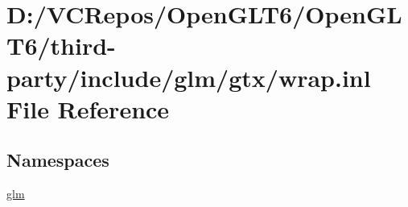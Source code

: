 \hypertarget{wrap_8inl}{}\section{D\+:/\+V\+C\+Repos/\+Open\+G\+L\+T6/\+Open\+G\+L\+T6/third-\/party/include/glm/gtx/wrap.inl File Reference}
\label{wrap_8inl}
\subsection*{Namespaces}
\begin{DoxyCompactItemize}
\item 
 \mbox{\hyperlink{namespaceglm}{glm}}
\end{DoxyCompactItemize}

